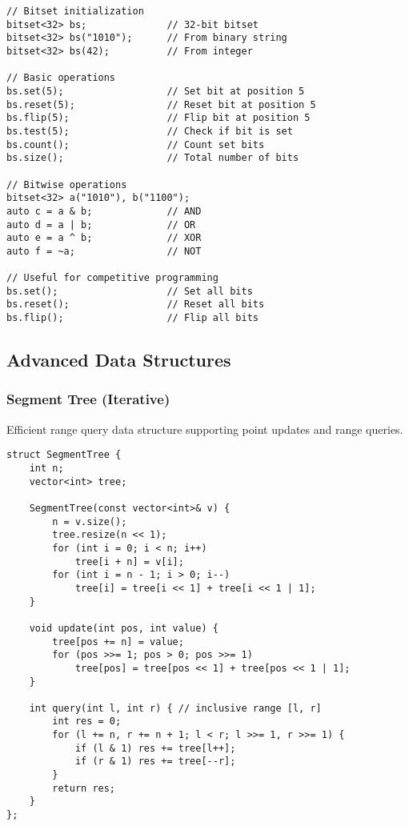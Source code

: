 \documentclass[11pt,a4paper]{article}
\begin{document}
\begin{lstlisting}[caption={Bitset Operations}]
// Bitset initialization
bitset<32> bs;              // 32-bit bitset
bitset<32> bs("1010");      // From binary string
bitset<32> bs(42);          // From integer

// Basic operations
bs.set(5);                  // Set bit at position 5
bs.reset(5);                // Reset bit at position 5
bs.flip(5);                 // Flip bit at position 5
bs.test(5);                 // Check if bit is set
bs.count();                 // Count set bits
bs.size();                  // Total number of bits

// Bitwise operations
bitset<32> a("1010"), b("1100");
auto c = a & b;             // AND
auto d = a | b;             // OR
auto e = a ^ b;             // XOR
auto f = ~a;                // NOT

// Useful for competitive programming
bs.set();                   // Set all bits
bs.reset();                 // Reset all bits
bs.flip();                  // Flip all bits
\end{lstlisting}

\newpage

\subsection{Advanced Data Structures}

\subsubsection{Segment Tree (Iterative)}
Efficient range query data structure supporting point updates and range queries.

\begin{lstlisting}[caption={Segment Tree for Range Sum}]
struct SegmentTree {
    int n;
    vector<int> tree;

    SegmentTree(const vector<int>& v) {
        n = v.size();
        tree.resize(n << 1);
        for (int i = 0; i < n; i++)
            tree[i + n] = v[i];
        for (int i = n - 1; i > 0; i--)
            tree[i] = tree[i << 1] + tree[i << 1 | 1];
    }

    void update(int pos, int value) {
        tree[pos += n] = value;
        for (pos >>= 1; pos > 0; pos >>= 1)
            tree[pos] = tree[pos << 1] + tree[pos << 1 | 1];
    }

    int query(int l, int r) { // inclusive range [l, r]
        int res = 0;
        for (l += n, r += n + 1; l < r; l >>= 1, r >>= 1) {
            if (l & 1) res += tree[l++];
            if (r & 1) res += tree[--r];
        }
        return res;
    }
};
\end{lstlisting}
\end{document}
